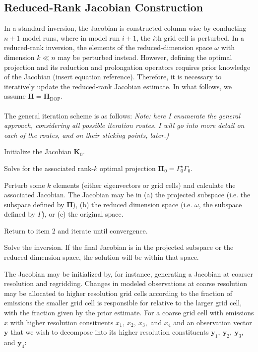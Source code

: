 \documentclass{article}
\newenvironment{packed_enum}{
	\begin{enumerate}
		\setlength{\itemsep}{1pt}
		\setlength{\parskip}{0pt}
		\setlength{\parsep}{0pt}
	}{\end{enumerate}}
\newcommand{\g}{\Gamma}
\newcommand{\gstar}{\Gamma^{\star}}
\newcommand{\x}{\mathbf{x}}
\newcommand{\xa}{\mathbf{x}_{\mathrm{A}}}
\newcommand{\y}{\mathbf{y}}
\newcommand{\K}{\mathbf{K}}
\newcommand{\dof}[1]{#1_\mathrm{DOF}}
\newcommand{\pidof}{\dof{\mathbf{\Pi}}}
\begin{document}
{\subsection{Reduced-Rank Jacobian Construction}{\label{red_rank_k}
In a standard inversion, the Jacobian is constructed column-wise by conducting $n+1$ model runs, where in model run $i+1$, the $i$th grid cell is perturbed. In a reduced-rank inversion, the elements of the reduced-dimension space $\omega$ with dimension $k \ll n$ may be perturbed instead. However, defining the optimal projection and its reduction and prolongation operators requires prior knowledge of the Jacobian (insert equation reference). Therefore, it is necessary to iteratively update the reduced-rank Jacobian estimate. In what follows, we assume $\mathbf{\Pi} = \pidof$.\\
\\
The general iteration scheme is as follows: \textit{Note: here I enumerate the general approach, considering all possible iteration routes. I will go into more detail on each of the routes, and on their sticking points, later.)}
\begin{packed_enum}%
	\item Initialize the Jacobian $\K_0$. 
	\item Solve for the associated rank-$k$ optimal projection $\mathbf{\Pi}_0 = \gstar_0\g_0$.
	\item Perturb some $k$ elements (either eigenvectors or grid cells) and calculate the associated Jacobian. The Jacobian may be in (a) the projected subspace (i.e. the subspace defined by $\mathbf{\Pi}$), (b) the reduced dimension space (i.e. $\omega$, the subspace defined by $\g$), or (c) the original space.
	\item Return to item 2 and iterate until convergence.
	\item Solve the inversion. If the final Jacobian is in the projected subspace or the reduced dimension space, the solution will be within that space.\\
\end{packed_enum}
The Jacobian may be initialized by, for instance, generating a Jacobian at coarser resolution and regridding. Changes in modeled observations at coarse resolution may be allocated to higher resolution grid cells according to the fraction of emissions the smaller grid cell is responsible for relative to the larger grid cell, with the fraction given by the prior estimate. For a coarse grid cell with emissions $x$ with higher resolution consituents $x_1,\ x_2,\ x_3,$ and $x_4$ and an observation vector $\y$ that we wish to decompose into its higher resolution constituents $\y_1,\ \y_2,\ \y_3,$ and $\y_4$:
}}
\end{document}
